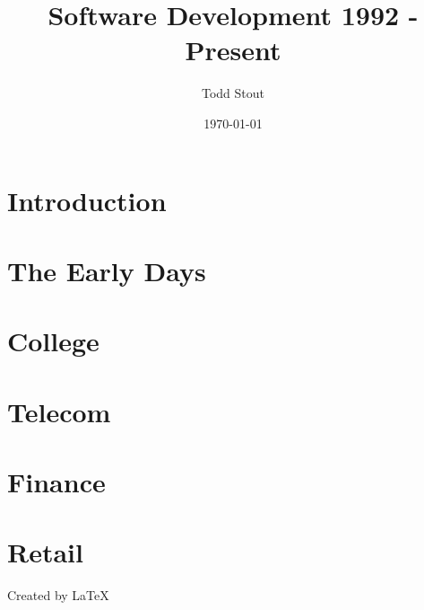\documentclass[12pt]{book}
\begin{document}
\title{Software Development 1992 - Present}
\author{Todd Stout}
\date{\today}

\maketitle

\tableofcontents

\chapter{Introduction}


\chapter{The Early Days}


\chapter{College}


\chapter{Telecom}


\chapter{Finance}


\chapter{Retail}


Created by \LaTeX\
	
\end{document}
